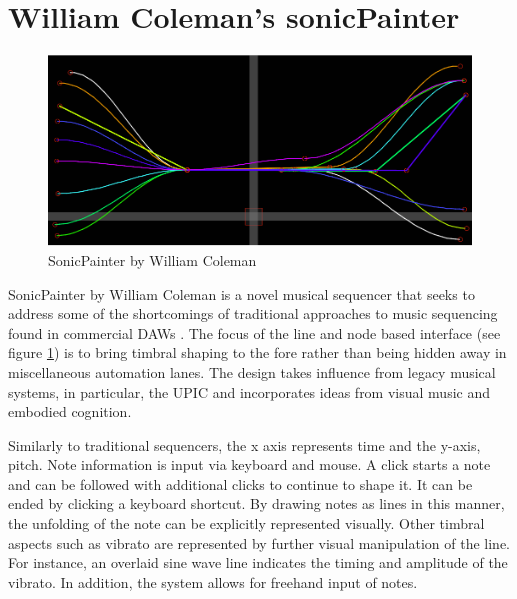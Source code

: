 \documentclass[12pt]{report}
\begin{document}
\section{William Coleman's sonicPainter}
\label{sec:orgc177a72}
\begin{LATEX}
\begin{figure}[h]
\centering
\includegraphics[width=1.0\textwidth]{./assets/sonicpainter2.png}
\caption{SonicPainter by William Coleman}
\label{fig:sonicpainter}
\end{figure}
\label{orgad9164a}
\end{LATEX}
SonicPainter by William Coleman is a novel musical sequencer that seeks to
address some of the shortcomings of traditional approaches to music sequencing
found in commercial DAWs \cite{coleman_sonicpainter:_2015}. The focus of the
line and node based interface (see figure \ref{fig:sonicpainter}) is to bring
timbral shaping to the fore rather than being hidden away in miscellaneous
automation lanes. The design takes influence from legacy musical systems, in
particular, the UPIC and incorporates ideas from visual music and embodied
cognition.

Similarly to traditional sequencers, the x axis represents time and the y-axis,
pitch. Note information is input via keyboard and mouse. A click starts a note
and can be followed with additional clicks to continue to shape it. It can be
ended by clicking a keyboard shortcut. By drawing notes as lines in this manner,
the unfolding of the note can be explicitly represented visually. Other timbral
aspects such as vibrato are represented by further visual manipulation of the
line. For instance, an overlaid sine wave line indicates the timing and
amplitude of the vibrato. In addition, the system allows for freehand input of
notes. 
\end{document}
